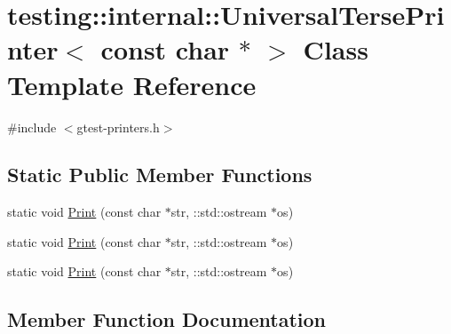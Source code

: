 \hypertarget{classtesting_1_1internal_1_1_universal_terse_printer_3_01const_01char_01_5_01_4}{}\section{testing\+::internal\+::Universal\+Terse\+Printer$<$ const char $\ast$ $>$ Class Template Reference}
\label{classtesting_1_1internal_1_1_universal_terse_printer_3_01const_01char_01_5_01_4}


{\ttfamily \#include $<$gtest-\/printers.\+h$>$}

\subsection*{Static Public Member Functions}
\begin{DoxyCompactItemize}
\item 
static void \mbox{\hyperlink{classtesting_1_1internal_1_1_universal_terse_printer_3_01const_01char_01_5_01_4_a37a3be2d26dc07b24d16c2b5eb88ecda}{Print}} (const char $\ast$str, \+::std\+::ostream $\ast$os)
\item 
static void \mbox{\hyperlink{classtesting_1_1internal_1_1_universal_terse_printer_3_01const_01char_01_5_01_4_a37a3be2d26dc07b24d16c2b5eb88ecda}{Print}} (const char $\ast$str, \+::std\+::ostream $\ast$os)
\item 
static void \mbox{\hyperlink{classtesting_1_1internal_1_1_universal_terse_printer_3_01const_01char_01_5_01_4_a37a3be2d26dc07b24d16c2b5eb88ecda}{Print}} (const char $\ast$str, \+::std\+::ostream $\ast$os)
\end{DoxyCompactItemize}


\subsection{Member Function Documentation}
\mbox{\label{classtesting_1_1internal_1_1_universal_terse_printer_3_01const_01char_01_5_01_4_a37a3be2d26dc07b24d16c2b5eb88ecda}} 
